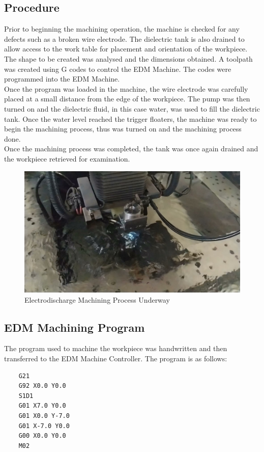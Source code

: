 \subsection{Procedure}
Prior to beginning the machining operation, the machine is checked for any defects such as a broken wire electrode. The dielectric tank is also drained to allow access to the work table for placement and orientation of the workpiece.\\
The shape to be created was analysed and the dimensions obtained. A toolpath was created using G codes to control the EDM Machine. The codes were programmed into the EDM Machine.\\
Once the program was loaded in the machine, the wire electrode was carefully placed at a small distance from the edge of the workpiece. The pump was then turned on and the dielectric fluid, in this case water, was used to fill the dielectric tank. Once the water level reached the trigger floaters, the machine was ready to begin the machining process, thus was turned on and the machining process done.\\
Once the machining process was completed, the tank was once again drained and the workpiece retrieved for examination.
\begin{figure}[h!]
	\centering
	\includegraphics[width=0.7\linewidth]{Figures/edmmachining}
	\caption[EDM Machining Process]{Electrodischarge Machining Process Underway}
	\label{fig:cutting}
\end{figure}
\subsection{EDM Machining Program}
The program used to machine the workpiece was  handwritten and then transferred to the EDM Machine Controller. The program is as follows:
\begin{verbatim}
	G21
	G92 X0.0 Y0.0
	S1D1
	G01 X7.0 Y0.0
	G01 X0.0 Y-7.0
	G01 X-7.0 Y0.0
	G00 X0.0 Y0.0
	M02
\end{verbatim}